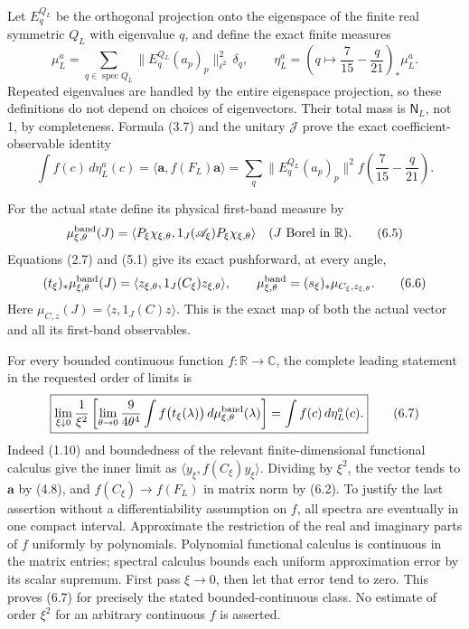 \documentclass[
  11pt,
]{article}
\begin{document}
Let \(E^{Q_L}_q\) be the orthogonal projection onto the eigenspace of
the finite real symmetric \(Q_L\) with eigenvalue \(q\), and define the
exact finite measures \[
 \mu_L^a=\sum_{q\in\operatorname{spec}Q_L}
          \|E^{Q_L}_q(a_p)_p\|_{\ell^2}^2\,\delta_q,
 \qquad
 \eta_L^a=\left(q\mapsto\frac7{15}-\frac q{21}\right)_*\mu_L^a.
\tag{6.3}
\] Repeated eigenvalues are handled by the entire eigenspace projection,
so these definitions do not depend on choices of eigenvectors. Their
total mass is \(\mathsf N_L\), not 1, by completeness. Formula (3.7) and
the unitary \(\mathcal J\) prove the exact coefficient-observable
identity \[
 \int f(c)\,d\eta_L^a(c)
 =\langle\mathbf a,f(F_L)\mathbf a\rangle
 =\sum_q\|E^{Q_L}_q(a_p)_p\|^2f\!\left(\frac7{15}-\frac q{21}\right).
\tag{6.4}
\]

For the actual state define its physical first-band measure by \[
 \mu^{\rm band}_{\xi,\theta}(J)
 =\langle P_\xi\chi_{\xi,\theta},
             1_J(\mathscr A_\xi)P_\xi\chi_{\xi,\theta}\rangle
 \quad (J\text{ Borel in }\mathbb R).
\tag{6.5}
\] Equations (2.7) and (5.1) give its exact pushforward, at every angle,
\[
 (t_\xi)_*\mu^{\rm band}_{\xi,\theta}(J)
     =\langle z_{\xi,\theta},1_J(C_\xi)z_{\xi,\theta}\rangle,
 \qquad
 \mu^{\rm band}_{\xi,\theta}
     =(s_\xi)_*\mu_{C_\xi,z_{\xi,\theta}}.
\tag{6.6}
\] Here \(\mu_{C,z}(J)=\langle z,1_J(C)z\rangle\). This is the exact map
of both the actual vector and all its first-band observables.

For every bounded continuous function \(f:\mathbb R\to\mathbb C\), the
complete leading statement in the requested order of limits is \[
\boxed{
 \lim_{\xi\downarrow0}\frac1{\xi^2}
 \left[\lim_{\theta\to0}\frac9{4\theta^4}
  \int f\bigl(t_\xi(\lambda)\bigr)
             \,d\mu^{\rm band}_{\xi,\theta}(\lambda)\right]
 =\int f(c)\,d\eta_L^a(c).}
\tag{6.7}
\] Indeed (1.10) and boundedness of the relevant finite-dimensional
functional calculus give the inner limit as
\(\langle y_\xi,f(C_\xi)y_\xi\rangle\). Dividing by \(\xi^2\), the
vector tends to \(\mathbf a\) by (4.8), and \(f(C_\xi)\to f(F_L)\) in
matrix norm by (6.2). To justify the last assertion without a
differentiability assumption on \(f\), all spectra are eventually in one
compact interval. Approximate the restriction of the real and imaginary
parts of \(f\) uniformly by polynomials. Polynomial functional calculus
is continuous in the matrix entries; spectral calculus bounds each
uniform approximation error by its scalar supremum. First pass
\(\xi\to0\), then let that error tend to zero. This proves (6.7) for
precisely the stated bounded-continuous class. No estimate of order
\(\xi^2\) for an arbitrary continuous \(f\) is asserted.
\end{document}
